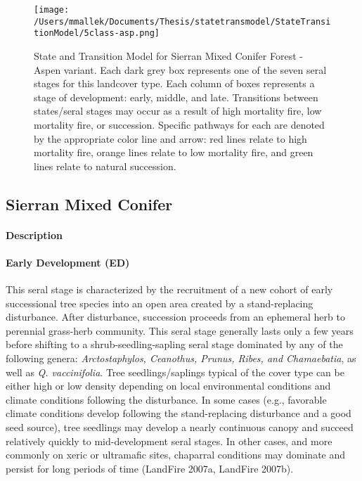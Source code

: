 \begin{figure}[htbp]
\centering
\texttt{[image: /Users/mmallek/Documents/Thesis/statetransmodel/StateTransitionModel/5class-asp.png]}
\caption{State and Transition Model for Sierran Mixed Conifer Forest - Aspen variant. Each dark grey box represents one of the seven seral stages for this landcover type. Each column of boxes represents a stage of development: early, middle, and late. Transitions between states/seral stages may occur as a result of high mortality fire, low mortality fire, or succession. Specific pathways for each are denoted by the appropriate color line and arrow: red lines relate to high mortality fire, orange lines relate to low mortality fire, and green lines relate to natural succession.} 
\label{transmodel_smc-asp}
\end{figure}

\subsection*{Sierran Mixed Conifer }

\paragraph{Description}
\paragraph{Early Development (ED)} This seral stage is characterized by the recruitment of a new cohort of early successional tree species into an open area created by a stand-replacing disturbance. After disturbance, succession proceeds from an ephemeral herb to perennial grass-herb community. This seral stage generally lasts only a few years before shifting to a shrub-seedling-sapling seral stage dominated by any of the following genera: \emph{Arctostaphylos, Ceanothus, Prunus, Ribes, and Chamaebatia}, as well as \emph{Q. vaccinifolia}. Tree seedlings/saplings typical of the cover type can be either high or low density depending on local environmental conditions and climate conditions following the disturbance. In some cases (e.g., favorable climate conditions develop following the stand-replacing disturbance and a good seed source), tree seedlings may develop a nearly continuous canopy and succeed relatively quickly to mid-development seral stages. In other cases, and more commonly on xeric or ultramafic sites, chaparral conditions may dominate and persist for long periods of time (LandFire 2007a, LandFire 2007b).

